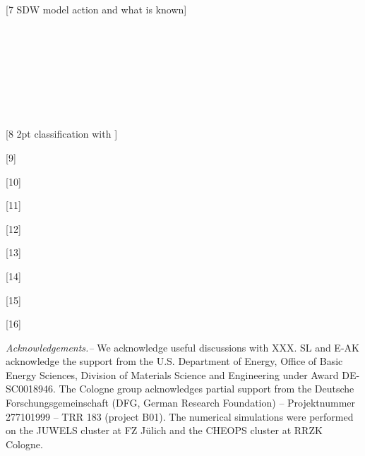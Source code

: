 \documentclass[amsmath,amssymb, aps, prx, longbibliography, twocolumn]{revtex4-1}
\begin{document}
[7 SDW model action and what is known]
\\
\\
\\
\\
\\
\\
\\
\\
\\

[8 2pt classification with ]

[9]

[10]

[11]

[12]

[13]

[14]

[15]

[16]

{\it Acknowledgements.--} 
We acknowledge useful discussions with XXX. SL and E-AK acknowledge the support from the U.S. Department of Energy, Office of Basic Energy Sciences, Division of Materials Science and Engineering under Award DE-SC0018946.
The Cologne group acknowledges partial support from the Deutsche Forschungsgemeinschaft (DFG, German Research Foundation) -- Projektnummer 277101999 -- TRR 183 (project B01).
The numerical simulations were performed on the JUWELS cluster at FZ J\"ulich and the CHEOPS cluster at RRZK Cologne.


%
%
\appendix
\end{document}

